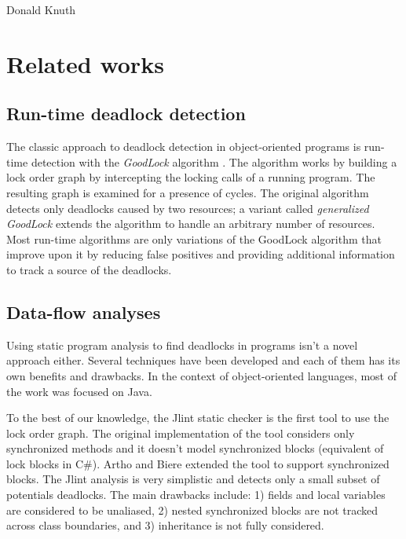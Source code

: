 %
         {Donald Knuth}
\chapter{Related works}
         
\section{Run-time deadlock detection}

The classic approach to deadlock detection in object-oriented programs is run-time detection with the \emph{GoodLock} algorithm \citep{Havelund2000}. The algorithm works by building a lock order graph by intercepting the locking calls of a running program. The resulting graph is examined for a presence of cycles. The original algorithm detects only deadlocks caused by two resources; a variant called \emph{generalized GoodLock} \citep{Agarwal2005,Agarwal2006} extends the algorithm to handle an arbitrary number of resources. Most run-time algorithms are only variations of the GoodLock algorithm that improve upon it by reducing false positives and providing additional information to track a source of the deadlocks.

\section{Data-flow analyses}

Using static program analysis to find deadlocks in programs isn't a novel approach either. Several techniques have been developed \citep{Artho2001,Praun2004,Jlint} and each of them has its own benefits and drawbacks. In the context of object-oriented languages, most of the work was focused on Java.

To the best of our knowledge, the Jlint static checker \citep{Jlint} is the first tool to use the lock order graph. The original implementation of the tool considers only synchronized methods and it doesn't model synchronized blocks (equivalent of lock blocks in C\#). Artho and Biere \citep{Artho2001} extended the tool to support synchronized blocks. The Jlint analysis is very simplistic and detects only a small subset of potentials deadlocks. The main drawbacks include: 1) fields and local variables are considered to be unaliased, 2) nested synchronized blocks are not tracked across class boundaries, and 3) inheritance is not fully considered.

